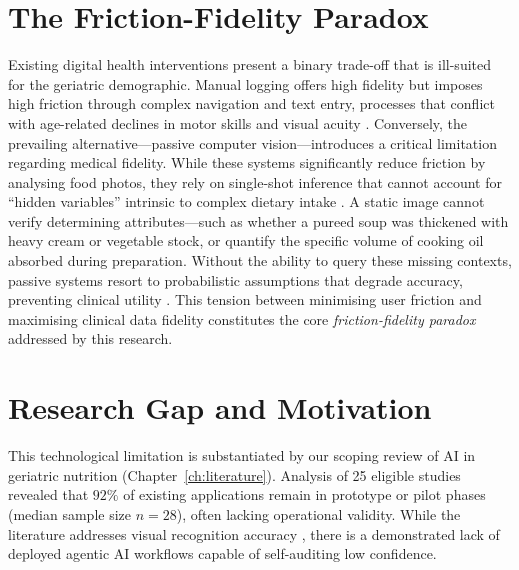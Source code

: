 \section{The Friction-Fidelity Paradox}

Existing digital health interventions present a binary trade-off that is ill-suited for the geriatric demographic. Manual logging offers high fidelity but imposes high friction through complex navigation and text entry, processes that conflict with age-related declines in motor skills and visual acuity \citep{wildenbosAgingBarriersInfluencing2018,czajaImpactAgingAccess2007,berkowskyFactorsPredictingDecisions2017}. Conversely, the prevailing alternative---passive computer vision---introduces a critical limitation regarding medical fidelity. While these systems significantly reduce friction by analysing food photos, they rely on single-shot inference that cannot account for ``hidden variables'' intrinsic to complex dietary intake \citep{minSurveyFoodComputing2019,zhangImagebasedMethodsDietary2024}. A static image cannot verify determining attributes---such as whether a pureed soup was thickened with heavy cream or vegetable stock, or quantify the specific volume of cooking oil absorbed during preparation. Without the ability to query these missing contexts, passive systems resort to probabilistic assumptions that degrade accuracy, preventing clinical utility \citep{loImageBasedFoodClassification2020}. This tension between minimising user friction and maximising clinical data fidelity constitutes the core \emph{friction-fidelity paradox} addressed by this research.

\section{Research Gap and Motivation}
\label{sec:intro-gap}

This technological limitation is substantiated by our scoping review of AI in geriatric nutrition (Chapter~\ref{ch:literature}). Analysis of 25 eligible studies revealed that $92\%$ of existing applications remain in prototype or pilot phases (median sample size $n=28$), often lacking operational validity. While the literature addresses visual recognition accuracy \citep{minSurveyFoodComputing2019,loImageBasedFoodClassification2020}, there is a demonstrated lack of deployed agentic AI workflows capable of self-auditing low confidence.

